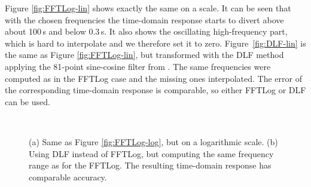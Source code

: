 \documentclass[extra, camera,%
    onecolumn,   %
    referee,     %
]{gji}
\newlength{\fwidth}
\begin{document}
Figure \ref{fig:FFTLog-lin} shows exactly the same on a
 scale. It can be seen that with
the chosen frequencies the time-domain response starts to divert above about
100\,s and below 0.3\,s. It also shows the oscillating high-frequency part,
which is hard to interpolate and we therefore set it to zero.
Figure~\ref{fig:DLF-lin} is the same as Figure \ref{fig:FFTLog-lin}, but
transformed with the DLF method applying the 81-point sine-cosine filter from
\cite{GEO.09.Key}. The same frequencies were computed as in the FFTLog case and
the missing ones interpolated. The error of the corresponding time-domain
response is comparable, so either FFTLog or DLF can be used.
%
\begin{figure}
  \centering
  \hfill
  \\
  \caption{(a) Same as Figure \ref{fig:FFTLog-log}, but on a logarithmic
  scale. (b) Using DLF instead of FFTLog, but computing the same frequency
  range as for the FFTLog. The resulting time-domain response has comparable
  accuracy.}
  \label{fig:lin-lin}
\end{figure}
\end{document}
